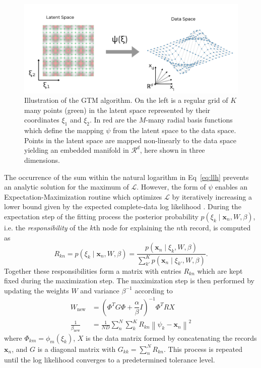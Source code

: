 \documentclass[remotesensing,article,submit,pdftex,moreauthors]{Definitions/mdpi}
\begin{document}
\begin{figure}[h!]
\centering
\includegraphics[width=\columnwidth]{paper/figures/methods/gtm-diagram.png}
\caption{Illustration of the GTM algorithm. On the left is a regular grid of $K$ many points (green) in the latent space represented by their coordinates $\xi_1$ and $\xi_2$. In red are the $M$-many radial basis functions which define the mapping $\psi$ from the latent space to the data space. Points in the latent space are mapped non-linearly to the data space yielding an embedded manifold in $\mathcal{R}^d$, here shown in three dimensions.\label{fig:gtm-diagram}}
\end{figure}  

The occurrence of the sum within the natural logarithm in Eq~\ref{eq:llh} prevents an analytic solution for the maximum of $\mathcal{L}$. However, the form of $\psi$ enables an Expectation-Maximization routine which optimizes $\mathcal{L}$ by iteratively increasing a lower bound given by the expected complete-data log likelihood \cite{em-algorithm}. During the expectation step of the fitting process the posterior probability $p(\xi_k \mid \mathbf{x}_n, W, \beta)$, i.e. the \textit{responsibility} of the $k$th node for explaining the $n$th record, is computed as 
\begin{equation}\label{eq:responsibility}
    R_{kn} = p(\xi_k \mid \mathbf{x}_n, W, \beta) = \dfrac{p(\mathbf{x}_n \mid \xi_k, W, \beta)}{\sum\limits_{k'}^{K} p(\mathbf{x}_n \mid \xi_{k'}, W, \beta)}.
\end{equation}
Together these responsibilities form a matrix with entries $R_{kn}$ which are kept fixed during the maximization step. The maximization step is then performed by updating the weights $W$ and variance $\beta^{-1}$ according to
\begin{align}\label{eq:m-step}
    W_{\text{new}} &= \left(\Phi^T G \Phi + \dfrac{\alpha}{\beta}I \right)^{-1} \Phi^T R X  \\
    \frac{1}{\beta_{\text{new}}} &= \frac{1}{ND} \sum\limits_{n}^{N} \sum\limits_{k}^{K} R_{kn} \left\lVert \psi_k - \mathbf{x}_n \right\rVert^2
\end{align}
where $\Phi_{km} = \phi_m(\xi_k)$, $X$ is the data matrix formed by concatenating the records $\mathbf{x}_n$, and $G$ is a diagonal matrix with $G_{kk} = \sum\limits_n^N R_{kn}$. This process is repeated until the log likelihood converges to a predetermined tolerance level.
\end{document}
